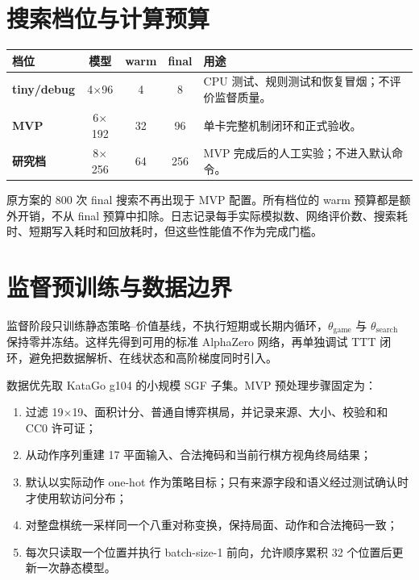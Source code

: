 \documentclass[UTF8,11pt,a4paper]{ctexart}
\newcommand{\gameinit}{\theta_{\mathrm{game}}}
\newcommand{\searchinit}{\theta_{\mathrm{search}}}
\begin{document}
\section{搜索档位与计算预算}

\begin{center}
\begin{tabularx}{0.93\textwidth}{>{\bfseries}lcccX}
\toprule
档位 & 模型 & warm & final & 用途 \\
\midrule
tiny/debug & 4$\times$96 & 4 & 8 & CPU 测试、规则测试和恢复冒烟；不评价监督质量。 \\
MVP & 6$\times$192 & 32 & 96 & 单卡完整机制闭环和正式验收。 \\
研究档 & 8$\times$256 & 64 & 256 & MVP 完成后的人工实验；不进入默认命令。 \\
\bottomrule
\end{tabularx}
\end{center}

原方案的 800 次 final 搜索不再出现于 MVP 配置。所有档位的 warm 预算都是额外开销，不从 final 预算中扣除。日志记录每手实际模拟数、网络评价数、搜索耗时、短期写入耗时和回放耗时，但这些性能值不作为完成门槛。

\section{监督预训练与数据边界}

监督阶段只训练静态策略--价值基线，不执行短期或长期内循环，$\gameinit$ 与 $\searchinit$ 保持零并冻结。这样先得到可用的标准 AlphaZero 网络，再单独调试 TTT 闭环，避免把数据解析、在线状态和高阶梯度同时引入。

数据优先取 KataGo g104 的小规模 SGF 子集\cite{katago-g104,katago-license}。MVP 预处理步骤固定为：

\begin{enumerate}
  \item 过滤 19$\times$19、面积计分、普通自博弈棋局，并记录来源、大小、校验和和 CC0 许可证；
  \item 从动作序列重建 17 平面输入、合法掩码和当前行棋方视角终局结果；
  \item 默认以实际动作 one-hot 作为策略目标；只有来源字段和语义经过测试确认时才使用软访问分布；
  \item 对整盘棋统一采样同一个八重对称变换，保持局面、动作和合法掩码一致；
  \item 每次只读取一个位置并执行 batch-size-1 前向，允许顺序累积 32 个位置后更新一次静态模型。
\end{enumerate}
\end{document}
